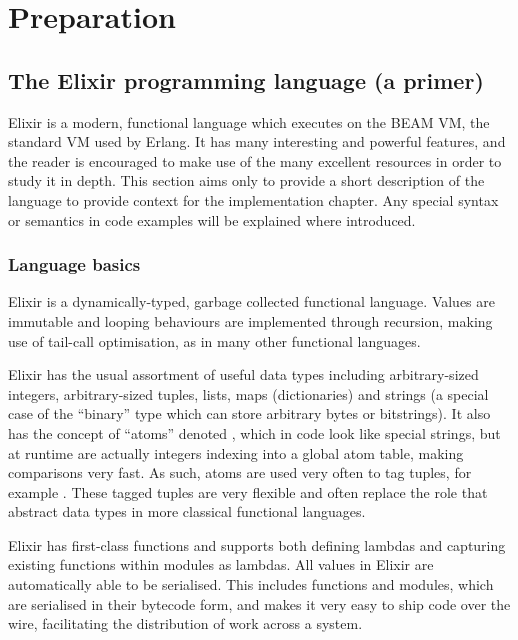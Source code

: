 \chapter{Preparation}\label{ch:prep}

\section{The Elixir programming language (a primer)}\label{sec:prep:elixir}

Elixir is a modern, functional language which executes on the BEAM VM, the standard VM used by Erlang.
It has many interesting and powerful features, and the reader is encouraged to make use of the many excellent resources in order to study it in depth.
This section aims only to provide a short description of the language to provide context for the implementation chapter.
Any special syntax or semantics in code examples will be explained where introduced.

\subsection{Language basics}

Elixir is a dynamically-typed, garbage collected functional language.
Values are immutable and looping behaviours are implemented through recursion, making use of tail-call optimisation, as in many other functional languages.

Elixir has the usual assortment of useful data types including arbitrary-sized integers, arbitrary-sized tuples, lists, maps (dictionaries) and strings (a special case of the ``binary'' type which can store arbitrary bytes or bitstrings).
It also has the concept of ``atoms'' denoted , which in code look like special strings, but at runtime are actually integers indexing into a global atom table, making comparisons very fast.
As such, atoms are used very often to tag tuples, for example .
These tagged tuples are very flexible and often replace the role that abstract data types in more classical functional languages.

Elixir has first-class functions and supports both defining lambdas and capturing existing functions within modules as lambdas.
All values in Elixir are automatically able to be serialised.
This includes functions and modules, which are serialised in their bytecode form, and makes it very easy to ship code over the wire, facilitating the distribution of work across a system.

